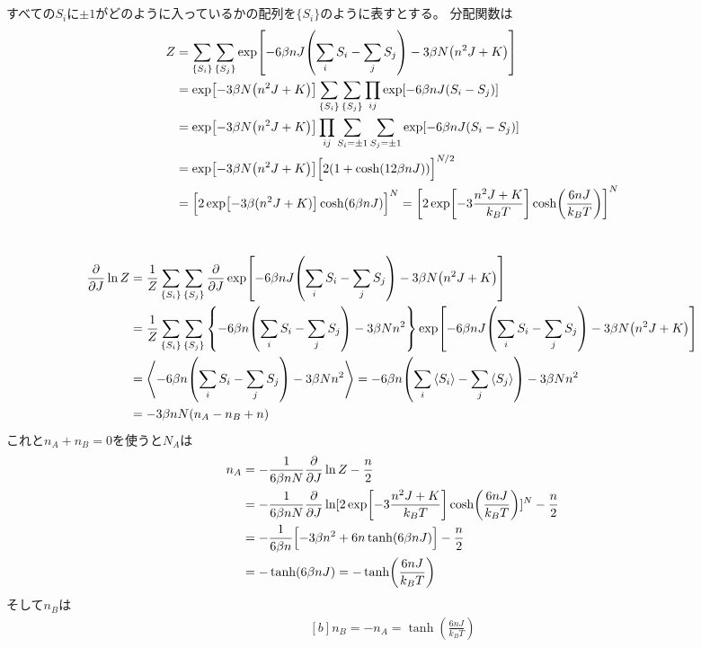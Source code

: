 \documentclass[../../master.tex]{subfiles}
\begin{document}
\section{}
すべての\(S_i\)に\(\pm 1\)がどのように入っているかの配列を\(\{S_i\}\)のように表すとする。
分配関数は
\begin{equation}\begin{aligned}[b]
    Z &= \sum_{\{S_i\}}\sum_{\{S_j\}}\exp[-6\beta nJ\qty(\sum_i S_i - \sum_j S_j)-3\beta N\qty(n^2J+K)]\\
    &= \exp[-3\beta N\qty(n^2J+K)]\sum_{\{S_i\}}\sum_{\{S_j\}}\prod_{ij}\exp[-6\beta nJ\qty(S_i - S_j)]\\
    &= \exp[-3\beta N\qty(n^2J+K)]\prod_{ij} \sum_{S_i = \pm 1}\sum_{S_j = \pm 1}\exp[-6\beta nJ\qty(S_i - S_j)]\\
    &= \exp[-3\beta N\qty(n^2J+K)]\Bigl[2(1+\cosh(12\beta nJ))\Bigr]^{N/2}\\
    &= \Bigl[2\exp[-3\beta(n^2J+K)]\cosh(6\beta nJ)\Bigr]^N
    =  \qty[2\exp[-3\frac{n^2J+K}{k_BT}]\cosh(\frac{6nJ}{k_BT})]^N
\end{aligned}\end{equation}

\section{}
\begin{equation}\begin{aligned}[b]
    \pdv{J}\ln Z
    &= \frac{1}{Z}\sum_{\{S_i\}}\sum_{\{S_j\}}\pdv{J} \exp[-6\beta nJ\qty(\sum_i S_i - \sum_j S_j)-3\beta N\qty(n^2J+K)]\\
    &= \frac{1}{Z}\sum_{\{S_i\}}\sum_{\{S_j\}}\qty{-6\beta n\qty(\sum_i S_i - \sum_j S_j)-3\beta Nn^2} \exp[-6\beta nJ\qty(\sum_i S_i - \sum_j S_j)-3\beta N\qty(n^2J+K)]\\
    &= \ev{-6\beta n\qty(\sum_i S_i - \sum_j S_j)-3\beta Nn^2}
    = -6\beta n\qty(\sum_i \ev{S_i} - \sum_j \ev{S_j})-3\beta Nn^2\\
    &= -3\beta nN\qty(n_A-n_B+n)
\end{aligned}\end{equation}
これと\(n_A+n_B = 0\)を使うと\(N_A\)は
\begin{equation}\begin{aligned}[b]
    n_A &= -\frac{1}{6\beta nN}\pdv{J}\ln Z -\frac{n}{2}\\
    &= -\frac{1}{6\beta nN}\pdv{J}\ln[2\exp[-3\frac{n^2J+K}{k_BT}]\cosh(\frac{6nJ}{k_BT})]^N - \frac{n}{2}\\
    &= -\frac{1}{6\beta n}\Bigl[-3\beta n^2+6n\tanh(6\beta n J)\Bigr] - \frac{n}{2}\\
    &= -\tanh(6\beta nJ) = - \tanh(\frac{6nJ}{k_BT})
\end{aligned}\end{equation}
そして\(n_B\)は
\begin{equation}\begin{aligned}[b]
    n_B = -n_A = \tanh(\frac{6nJ}{k_BT})
\end{aligned}\end{equation}
\end{document}

